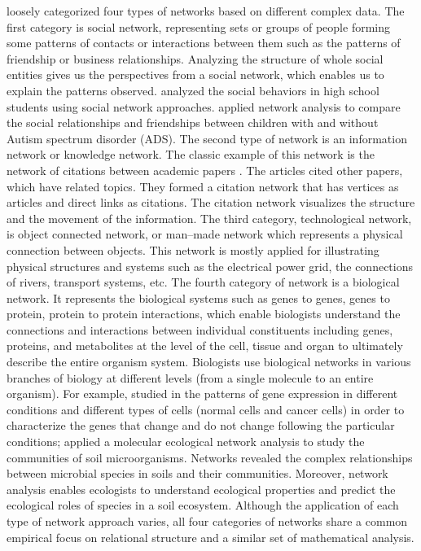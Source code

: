  loosely categorized four types of networks based on different complex data. The first category is social network, representing sets or groups of people forming some patterns of contacts or interactions between them such as the patterns of friendship or business relationships. Analyzing the structure of whole social entities gives us the perspectives from a social network, which enables us to explain the patterns observed.  analyzed the social behaviors in high school students using social network approaches.  applied network analysis to compare the social relationships and friendships between children with and without Autism spectrum disorder (ADS). The second type of network is an information network or knowledge network. The classic example of this network is the network of citations between academic papers . The articles cited other papers, which have related topics. They formed a citation network that has vertices as articles and direct links as citations. The citation network visualizes the structure and the movement of the information. The third category, technological network, is object connected network, or man--made network which represents a physical connection between objects. This network is mostly applied for illustrating physical structures and systems such as the electrical power grid, the connections of rivers, transport systems, etc. The fourth category of network is a biological network. It represents the biological systems such as genes to genes, genes to protein, protein to protein interactions, which enable biologists understand the connections and interactions between individual constituents including genes, proteins, and metabolites at the level of the cell, tissue and organ to ultimately describe the entire organism system. Biologists use biological networks in various branches of biology at different levels (from a single molecule to an entire organism). For example,  studied in the patterns of gene expression in different conditions and different types of cells (normal cells and cancer cells) in order to characterize the genes that change and do not change following the particular conditions;  applied a molecular ecological network analysis to study the communities of soil microorganisms. Networks revealed the complex relationships between microbial species in soils and their communities. Moreover, network analysis enables ecologists to understand ecological properties and predict the ecological roles of species in a soil ecosystem. Although the application of each type of network approach varies, all four categories of networks share a common empirical focus on relational structure and a similar set of mathematical analysis. 

